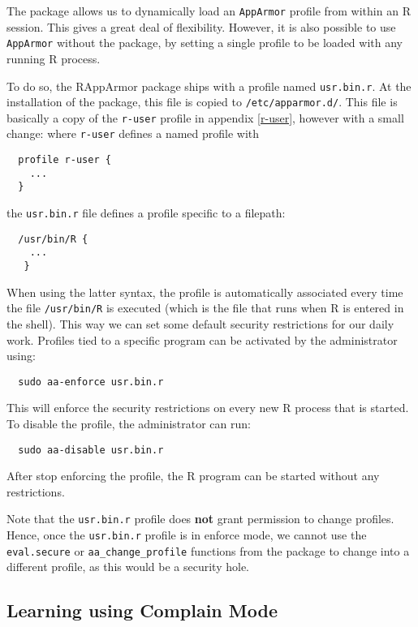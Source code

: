 \documentclass[article]{jss}
\newcommand{\R}{\textsf{R}\xspace}
\newcommand{\AppArmor}{\texttt{AppArmor}\xspace}
\newcommand{\RAppArmor}{\pkg{RAppArmor}\xspace}
\begin{document}
The \RAppArmor package allows us to dynamically load an \AppArmor profile
from within an \R session. This gives a great deal of flexibility. However, it
is also possible to use \AppArmor without the \RAppArmor package, by setting a
single profile to be loaded with any running \R process.

To do so, the RAppArmor package ships with a profile named \texttt{usr.bin.r}.
At the installation of the package, this file is copied to \texttt{/etc/apparmor.d/}.
This file is basically a copy of the \texttt{r-user} profile in appendix
\ref{r-user}, however with a small change: where \texttt{r-user} defines
a named profile with
\begin{verbatim}
  profile r-user {
    ...
  }
\end{verbatim}
the \texttt{usr.bin.r} file defines a profile specific to a filepath:
\begin{verbatim}
  /usr/bin/R {
    ...
   }
\end{verbatim}

When using the latter syntax, the profile is automatically associated every time
the file \texttt{/usr/bin/R} is executed (which is the file that runs when
\R is entered in the shell). This way we can set some default security
restrictions for our daily work. Profiles tied to a specific program can be
activated by the administrator using:
\begin{verbatim}
  sudo aa-enforce usr.bin.r
\end{verbatim}
This will enforce the security restrictions on every new \R process that is
started. To disable the profile, the administrator can run:
\begin{verbatim}
  sudo aa-disable usr.bin.r
\end{verbatim}
After stop enforcing the profile, the \R program can be started without any
restrictions.

Note that the \texttt{usr.bin.r} profile does \textbf{not} grant permission to
change profiles. Hence, once the \texttt{usr.bin.r} profile is in enforce mode,
we cannot use the \texttt{eval.secure} or \texttt{aa\_change\_profile} functions
from the \RAppArmor package to change into a different profile, as this
would be a security hole.

\subsection{Learning using Complain Mode}
\end{document}
